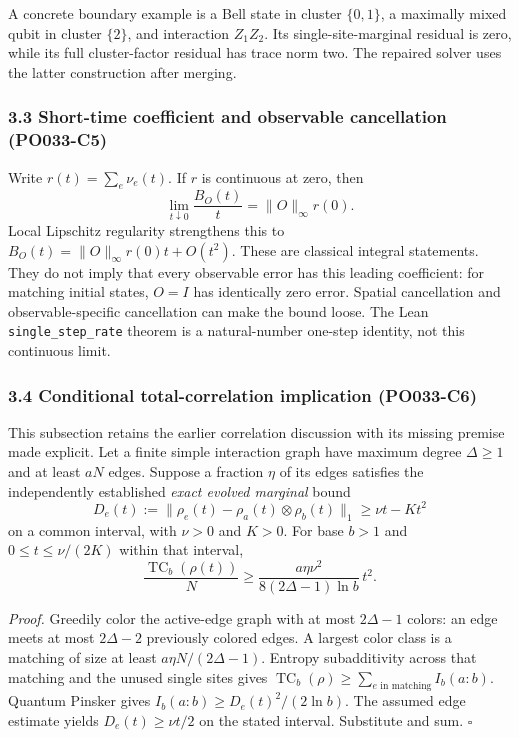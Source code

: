 \documentclass[
]{article}
\begin{document}
A concrete boundary example is a Bell state in cluster \(\{0,1\}\), a maximally mixed qubit in cluster \(\{2\}\), and interaction \(Z_1Z_2\). Its single-site-marginal residual is zero, while its full cluster-factor residual has trace norm two. The repaired solver uses the latter construction after merging.

\subsubsection{3.3 Short-time coefficient and observable cancellation (PO033-C5)}\label{short-time-coefficient-and-observable-cancellation-po033-c5}

Write \(r(t)=\sum_e\nu_e(t)\). If \(r\) is continuous at zero, then
\[
\lim_{t\downarrow0}\frac{B_O(t)}{t}
=\|O\|_\infty r(0).
\]
Local Lipschitz regularity strengthens this to
\(B_O(t)=\|O\|_\infty r(0)t+O(t^2)\).
These are classical integral statements. They do not imply that every observable error has this leading coefficient: for matching initial states, \(O=I\) has identically zero error. Spatial cancellation and observable-specific cancellation can make the bound loose. The Lean \texttt{single\_step\_rate} theorem is a natural-number one-step identity, not this continuous limit.

\subsubsection{3.4 Conditional total-correlation implication (PO033-C6)}\label{conditional-total-correlation-implication-po033-c6}

This subsection retains the earlier correlation discussion with its missing premise made explicit. Let a finite simple interaction graph have maximum degree \(\Delta\ge1\) and at least \(aN\) edges. Suppose a fraction \(\eta\) of its edges satisfies the independently established \emph{exact evolved marginal} bound
\[
D_e(t):=\|\rho_e(t)-\rho_a(t)\otimes\rho_b(t)\|_1
\ge\nu t-Kt^2
\]
on a common interval, with \(\nu>0\) and \(K>0\). For base \(b>1\) and
\(0\le t\le\nu/(2K)\) within that interval,
\[
\frac{\operatorname{TC}_b(\rho(t))}{N}
\ge \frac{a\eta\nu^2}{8(2\Delta-1)\ln b}\,t^2.
\]

\emph{Proof.} Greedily color the active-edge graph with at most \(2\Delta-1\) colors: an edge meets at most \(2\Delta-2\) previously colored edges. A largest color class is a matching of size at least \(a\eta N/(2\Delta-1)\). Entropy subadditivity across that matching and the unused single sites gives
\(\operatorname{TC}_b(\rho)\ge\sum_{e\text{ in matching}}I_b(a:b)\).
Quantum Pinsker gives \(I_b(a:b)\ge D_e(t)^2/(2\ln b)\).
The assumed edge estimate yields \(D_e(t)\ge\nu t/2\) on the stated interval. Substitute and sum. \(\square\)
\end{document}
